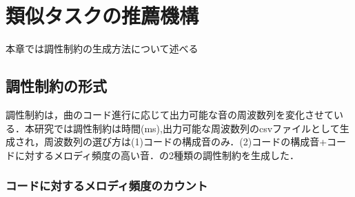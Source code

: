 \chapter{類似タスクの推薦機構}
本章では調性制約の生成方法について述べる
\section{調性制約の形式}
調性制約は，曲のコード進行に応じて出力可能な音の周波数列を変化させている．本研究では調性制約は時間(ms),出力可能な周波数列のcsvファイルとして生成され，周波数列の選び方は(1)コードの構成音のみ．(2)コードの構成音+コードに対するメロディ頻度の高い音．の2種類の調性制約を生成した．
\subsection{コードに対するメロディ頻度のカウント}
